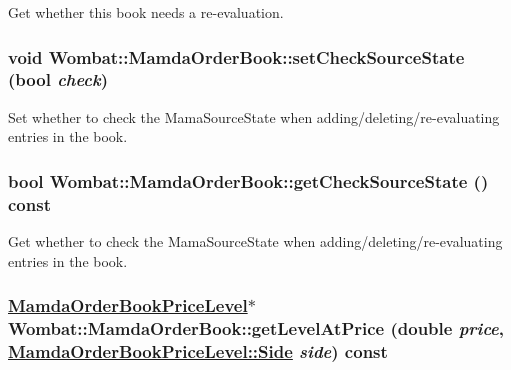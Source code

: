 Get whether this book needs a re-evaluation. 

\hypertarget{classWombat_1_1MamdaOrderBook_eae6354d517d13eeb4cae589c888802b}{
\subsubsection[setCheckSourceState]{\setlength{\rightskip}{0pt plus 5cm}void Wombat::Mamda\-Order\-Book::set\-Check\-Source\-State (bool {\em check})}}
\label{classWombat_1_1MamdaOrderBook_eae6354d517d13eeb4cae589c888802b}


Set whether to check the Mama\-Source\-State when adding/deleting/re-evaluating entries in the book. 

\hypertarget{classWombat_1_1MamdaOrderBook_f975146a011165fdd0230f88f4a6f1cf}{
\subsubsection[getCheckSourceState]{\setlength{\rightskip}{0pt plus 5cm}bool Wombat::Mamda\-Order\-Book::get\-Check\-Source\-State () const}}
\label{classWombat_1_1MamdaOrderBook_f975146a011165fdd0230f88f4a6f1cf}


Get whether to check the Mama\-Source\-State when adding/deleting/re-evaluating entries in the book. 

\hypertarget{classWombat_1_1MamdaOrderBook_1a16eb4ec553883692be61f800e4fbfc}{
\subsubsection[getLevelAtPrice]{\setlength{\rightskip}{0pt plus 5cm}\hyperlink{classWombat_1_1MamdaOrderBookPriceLevel}{Mamda\-Order\-Book\-Price\-Level}$\ast$ Wombat::Mamda\-Order\-Book::get\-Level\-At\-Price (double {\em price}, \hyperlink{classWombat_1_1MamdaOrderBookPriceLevel_384c34b0a74d874b8969dee9b0d3718d}{Mamda\-Order\-Book\-Price\-Level::Side} {\em side}) const}}
\label{classWombat_1_1MamdaOrderBook_1a16eb4ec553883692be61f800e4fbfc}


